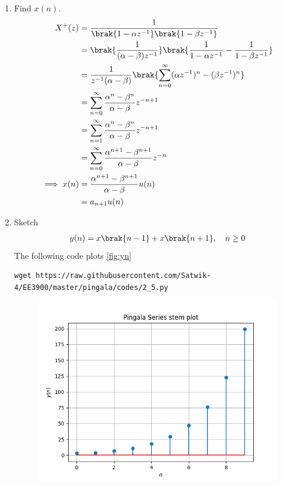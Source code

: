 \documentclass[journal,12pt,twocolumn]{IEEEtran}
\renewcommand\thesection{\arabic{section}}
\begin{document}
\begin{enumerate}[label=\thesection.\arabic*,ref=\thesection.\theenumi]
	\item Find $x(n)$.
	\begin{align}
	    X^{+}(z)    &= \frac{1}{\brak{1-\alpha z^{-1}} \brak{1-\beta z^{-1}}}\\
	    &=\brak{\frac{1}{(\alpha-\beta)z^{-1}}}\brak{\frac{1}{1-\alpha z^{-1}} - \frac{1}{1-\beta z^{-1}} }\\
	    &=\frac{1}{z^{-1}(\alpha-\beta)}\brak{\sum_{n=0}^\infty (\alpha z^{-1})^n-(\beta z^{-1})^n }\\
	    &= \sum_{n=0}^\infty \frac{\alpha^n-\beta^n}{\alpha-\beta}z^{-n+1}\\
	    &= \sum_{n=1}^\infty \frac{\alpha^n-\beta^n}{\alpha-\beta}z^{-n+1}\\
	    &= \sum_{n=0}^\infty \frac{\alpha^{n+1}-\beta^{n+1}}{\alpha-\beta}z^{-n}\\
	    \implies x(n) &= \frac{\alpha^{n+1}-\beta^{n+1}}{\alpha-\beta}u(n)\\
	    &=a_{n+1}u(n)\label{eq:xn}
	\end{align}
	\item Sketch 
\begin{align}
	y(n)	 = x\brak{n-1} + x\brak{n+1},  \quad n \ge 0
	\label{eq:10-orig-diff-rev}
\end{align}
 \solution The following code plots \ref{fig:yn}
	    \begin{lstlisting}
wget https://raw.githubusercontent.com/Satwik-4/EE3900/master/pingala/codes/2_5.py
\end{lstlisting}
\begin{figure}
    \centering
    \includegraphics[width=\columnwidth]{figures/2_5.png}

\end{figure}
\end{enumerate}
\end{document}
